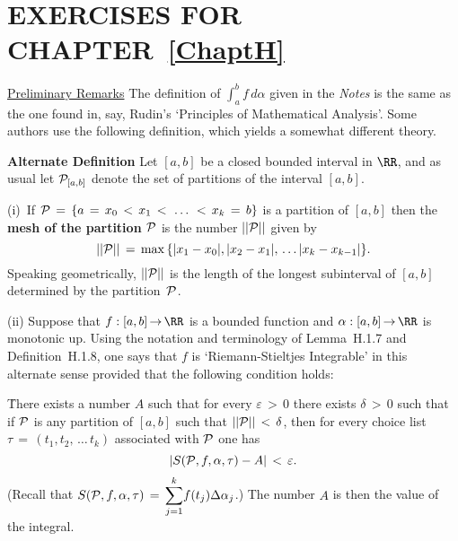                        \section{EXERCISES FOR CHAPTER~\ref{ChaptH}}
                        \label{SectHEX}

\V
\V
\V
\V

\noindent \ExHa \underline{Preliminary Remarks} The definition of ${\displaystyle \int_{a}^{b} f\,d{\alpha}}$ given in the {\em Notes} is the same as the one found in,
    say, Rudin's `Principles of Mathematical Analysis'. Some authors use the following definition, which yields a somewhat different theory.

\V

        {\bf Alternate Definition} Let $[a,b]$ be a closed bounded interval in ${\RR}$, and as usual let ${\cal P}_{[a,b]}$ denote the set of partitions of the interval $[a,b]$.

\V

        (i)\, If ${\cal P} \,=\, \{a \,=\, x_{0}\,<\,x_{1}\,<\,\,{\ldots}\,\,<\,x_{k} \,=\, b\}$ is a partition of $[a,b]$ then the {\bf mesh of the partition ${\cal P}$} is the number $||{\cal P}||$ given by
        \begin{displaymath}
        ||{\cal P}|| \,=\, {\max}\,\{|x_{1}-x_{0}|, |x_{2}-x_{1}|,\,{\ldots}\,|x_{k}-x_{k-1}|\}.
        \end{displaymath}
    Speaking geometrically, $||{\cal P}||$ is the length of the longest subinterval of $[a,b]$ determined by the partition~${\cal P}$.

\V

        (ii) Suppose that $f:[a,b] \,{\rightarrow}\, {\RR}$ is a bounded function and ${\alpha}:[a,b] \,{\rightarrow}\, {\RR}$ is monotonic up.
    Using the notation and terminology of Lemma~H.1.7 and Definition~H.1.8, one says that $f$ is `Riemann-Stieltjes Integrable' in this alternate sense provided that the following condition holds:

       \h There exists a number $A$ such that for every ${\varepsilon}\,>\,0$ there exists ${\delta}\,>\,0$ such that if ${\cal P}$ is any partition of $[a,b]$ such that $||{\cal P}||\,<\,{\delta}$, then for every choice list ${\tau} \,=\, (t_{1},t_{2},\,{\ldots}\,t_{k})$ associated with ${\cal P}$ one has
        \begin{displaymath}
        \left|S({\cal P},f,{\alpha},{\tau}) - A\right|\,<\,{\varepsilon}.
        \end{displaymath}
    (Recall that $S({\cal P},f,{\alpha},{\tau}) \,=\, {\displaystyle \sum_{j=1}^{k}} f(t_{j}){\Delta}{\alpha}_{j}$.) The number $A$ is then the value of the integral.

